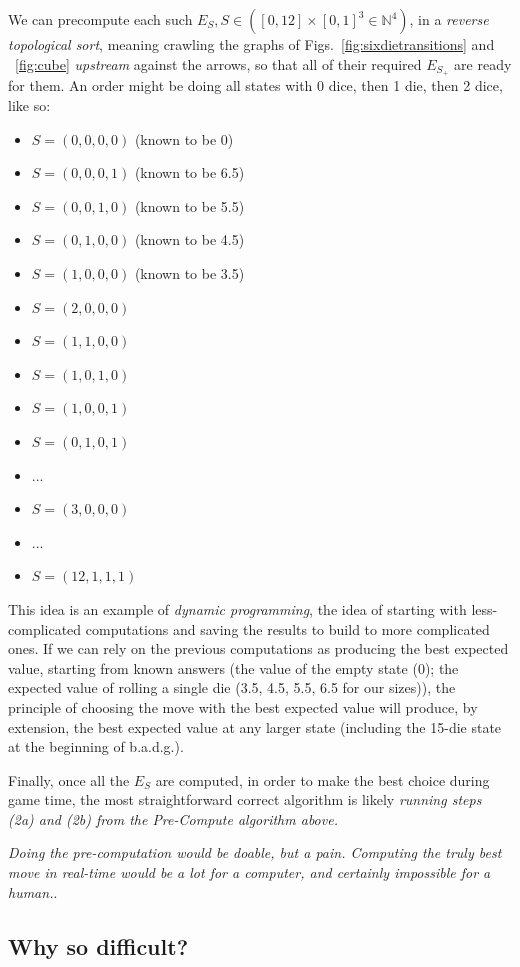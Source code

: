 \documentclass[11pt, oneside]{article} 	%
\begin{document}
We can precompute each such $E_{S}, S \in ([0,12 ] \times [0,1]^3 \in \mathbb{N}^4)$, in a \emph{reverse topological sort}, meaning crawling the graphs of Figs.~\ref{fig:sixdietransitions} and ~\ref{fig:cube} \emph{upstream} against the arrows, so that all of their required $E_{S_+}$ are ready for them. An order might be doing all states with 0 dice, then 1 die, then 2 dice, like so:
\begin{itemize}
\item $S = (0,0,0,0)$ (known to be 0)
\item $S = (0,0,0,1)$ (known to be 6.5)
\item $S = (0,0,1,0)$ (known to be 5.5)
\item $S = (0,1,0,0)$ (known to be 4.5)
\item $S = (1,0,0,0)$ (known to be 3.5)
\item $S = (2,0,0,0)$
\item $S = (1,1,0,0)$
\item $S = (1,0,1,0)$
\item $S = (1,0,0,1)$
\item $S = (0,1,0,1)$
\item ...
\item $S= (3, 0, 0, 0)$
\item ...
\item $S = (12, 1,  1, 1)$
\end{itemize}


This idea is an example of \emph{dynamic programming}, the idea of starting with less-complicated computations and saving the results to build to more complicated ones. If we can rely on the previous computations as producing the best expected value, starting from known answers (the value of the empty state (0); the expected value of rolling a single die (3.5, 4.5, 5.5, 6.5 for our sizes)), the principle of choosing the move with the best expected value will produce, by extension, the best expected value at any larger state (including the 15-die state at the beginning of b.a.d.g.). 

Finally, once all the $E_S$ are computed, in order to make the best choice during game time, the most straightforward correct algorithm is likely \emph{running steps (2a) and (2b) from the Pre-Compute algorithm above.}

\emph{Doing the pre-computation would be doable, but a pain. Computing the truly best move in real-time would be a lot for a computer, and certainly impossible for a human.}.

\subsection{Why so difficult?}
\end{document}
